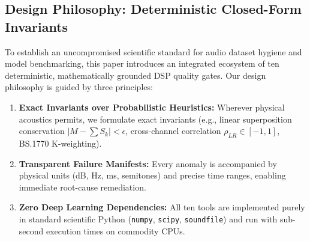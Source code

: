\documentclass[10pt,journal,compsoc]{IEEEtran}
\begin{document}
\subsection{Design Philosophy: Deterministic Closed-Form Invariants}
To establish an uncompromised scientific standard for audio dataset hygiene and model benchmarking, this paper introduces an integrated ecosystem of ten deterministic, mathematically grounded DSP quality gates. Our design philosophy is guided by three principles:
\begin{enumerate}
    \item \textbf{Exact Invariants over Probabilistic Heuristics:} Wherever physical acoustics permits, we formulate exact invariants (e.g., linear superposition conservation $|M - \sum S_k| < \epsilon$, cross-channel correlation $\rho_{LR} \in [-1, 1]$, BS.1770 K-weighting).
    \item \textbf{Transparent Failure Manifests:} Every anomaly is accompanied by physical units (dB, Hz, ms, semitones) and precise time ranges, enabling immediate root-cause remediation.
    \item \textbf{Zero Deep Learning Dependencies:} All ten tools are implemented purely in standard scientific Python (\texttt{numpy}, \texttt{scipy}, \texttt{soundfile}) and run with sub-second execution times on commodity CPUs.
\end{enumerate}
\end{document}
